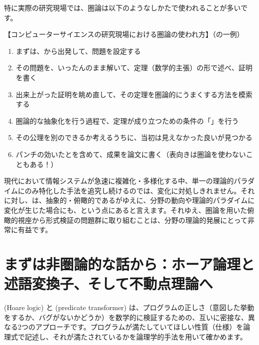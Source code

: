 \documentclass[
		head_space=20mm,
		foot_space=20mm,
		gutter=10mm,
		line_length=190mm
]{jlreq}
\begin{document}
\noindent 特に実際の研究現場では、圏論は以下のようなしかたで使われることが多いです。
\vspace{3pt}

\begin{framed}
\noindent 【コンピューターサイエンスの研究現場における圏論の使われ方】（の一例）
\begin{enumerate}
	\item まずは、から出発して、問題を設定する
	\item その問題を、いったんのまま解いて、定理（数学的主張）の形で述べ、証明を書く
	\item 出来上がった証明を眺め直して、その定理を圏論的にうまくする方法を模索する
	\item 圏論的な抽象化を行う過程で、定理が成り立つための条件の「」を行う
	\item その公理を別のできるか考えるうちに、当初は見えなかった良いが見つかる
	\item パンチの効いたとを含めて、成果を論文に書く（表向きは圏論を使わないこともある！）
\end{enumerate}
\end{framed}
\vspace{3pt}

\noindent 現代において情報システムが急速に複雑化・多様化する中、単一の理論的パラダイムにのみ特化した手法を追究し続けるのでは、変化に対処しきれません。それに対し、は、抽象的・俯瞰的であるがゆえに、分野の動向や理論的パラダイムに変化が生じた場合にも、という点にあると言えます。それゆえ、圏論を用いた俯瞰的視座から形式検証の問題群に取り組むことは、分野の理論的発展にとって非常に有益です。


\clearpage

\section{まずは非圏論的な話から：ホーア論理と述語変換子、そして不動点理論へ}

 (Hoare logic) と (predicate transformer) は、プログラムの正しさ（意図した挙動をするか、バグがないかどうか）を数学的に検証するための、互いに密接な、異なる2つのアプローチです。プログラムが満たしていてほしい性質（仕様）を論理式で記述し、それが満たされているかを論理学的手法を用いて確かめます。
\end{document}
